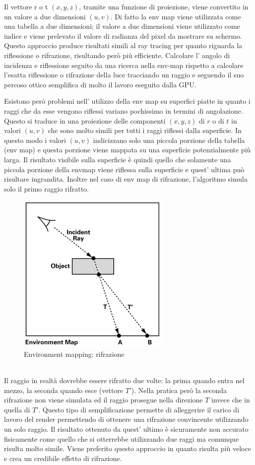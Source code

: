 Il vettore r o t $(x,y,z)$, tramite una funzione di proiezione, viene convertito in un valore a due dimensioni $(u,v)$. Di fatto la env map viene utilizzata come una tabella a due dimensioni; il valore a due dimensioni viene utilizzato come indice e viene prelevato il valore di radianza del pixel da mostrare su schermo.
Questo approccio produce risultati simili al ray tracing per quanto riguarda la riflessione o rifrazione, risultando però  più efficiente. 
Calcolare l’ angolo di incidenza e riflessione seguito da una ricerca nella env-map rispetto a calcolare l’esatta riflessione o rifrazione della luce tracciando un raggio e seguendo il suo percoso ottico semplifica di molto il lavoro eseguito dalla GPU. 

Esistono però problemi nell’ utilizzo della env map su superfici piatte in quanto i raggi che da esse vengono riflessi variano pochissimo in termini di angolazione. Questo si traduce in una proiezione delle componenti $(x,y,z)$ di $r$ o di $t$ in valori $(u,v)$ che sono molto simili per tutti i raggi riflessi dalla superficie. In questo modo i valori $(u,v)$ indicizzano solo una piccola porzione della tabella (env map) e questa porzione viene mappata su una superficie potenzialmente più larga. Il risultato visibile sulla superficie è quindi quello che solamente una piccola porzione della envmap viene riflessa sulla superficie e quest’ ultima può risultare ingrandita.
Inoltre nel caso di env map di rifrazione, l’algoritmo simula solo il primo raggio rifratto.
\\
\begin{figure}[htb]
\centering
\includegraphics[width=0.5\linewidth]{images/chapter_stato_arte/stato_arte_refr_2.png}\hfill
\caption[Environment mapping: rifrazione]{Environment mapping: rifrazione}
\label{fig:stato_arte_refr_2}
\end{figure}
\\
Il raggio in realtà dovrebbe essere rifratto due volte: la prima quando entra nel mezzo, la seconda quando esce (vettore $T’$). Nella pratica però la seconda rifrazione non viene simulata ed il raggio prosegue nella direzione $T$ invece che in quella di $T’$. 
Questo tipo di semplificazione permette di alleggerire il carico di lavoro del render permettendo di ottenere una rifrazione convincente utilizzando un solo raggio.
Il risultato ottenuto da quest’ ultimo è sicuramente non accurato fisicamente come quello che si otterrebbe utilizzando due raggi ma comunque risulta molto simile.
Viene preferito questo approccio in quanto risulta più veloce e crea un credibile effetto di rifrazione.

